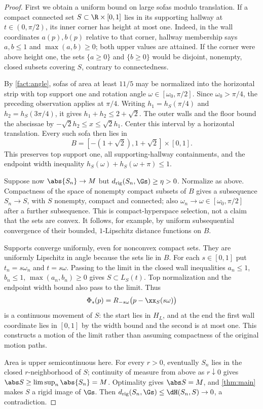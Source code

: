 \begin{proof}
First we obtain a uniform bound on large sofas modulo translation. If a
compact connected set $S\subset\R\times[0,1]$ lies in its supporting hallway
at $t\in(0,\pi/2)$, its inner corner has height at most one. Indeed, in the
wall coordinates $a(p),b(p)$ relative to that corner, hallway membership says
$a,b\le1$ and $\max(a,b)\ge0$; both upper values are attained. If the corner
were above height one, the sets $\{a\ge0\}$ and $\{b\ge0\}$ would be disjoint,
nonempty, closed subsets covering $S$, contrary to connectedness.

By \cref{fact:angle}, sofas of area at least $11/5$ may be normalized into
the horizontal strip with top support one and rotation angle
$\omega\in[\omega_0,\pi/2]$. Since $\omega_0>\pi/4$, the preceding observation
applies at $\pi/4$. Writing $h_1=h_S(\pi/4)$ and $h_2=h_S(3\pi/4)$, it gives
$h_1+h_2\le2+\sqrt2$. The outer walls and the floor bound the abscissae by
$-\sqrt2h_2\le x\le\sqrt2h_1$. Center this interval by a horizontal translation.
Every such sofa then lies in
\[
 B=[-(1+\sqrt2),1+\sqrt2]\times[0,1].
\]
This preserves top support one, all supporting-hallway containments, and the
endpoint width inequality $h_S(\omega)+h_S(\omega+\pi)\le1$.

Suppose now $\abs{S_n}\to M$ but $d_{\rm rig}(S_n,\Gs)\ge\eta>0$. Normalize
as above. Compactness of the space of nonempty compact subsets of $B$ gives
a subsequence $S_n\to S$, with $S$ nonempty, compact and connected; also
$\omega_n\to\omega\in[\omega_0,\pi/2]$ after a further subsequence.
This is compact-hyperspace selection, not a claim that the sets are convex.
It follows, for example, by uniform subsequential convergence of their
bounded, $1$-Lipschitz distance functions on $B$.

Supports converge uniformly, even for nonconvex compact sets. They are
uniformly Lipschitz in angle because the sets lie in $B$. For each
$s\in[0,1]$ put $t_n=s\omega_n$ and $t=s\omega$. Passing to the limit in the
closed wall inequalities $a_n\le1$, $b_n\le1$, $\max(a_n,b_n)\ge0$ gives
$S\subset L_S(t)$. Top normalization and the endpoint width bound also pass
to the limit. Thus
\[
 \Phi_s(p)=R_{-s\omega}\bigl(p-\xx_S(s\omega)\bigr)
\]
is a continuous movement of $S$: the start lies in $H_L$, and at the end the
first wall coordinate lies in $[0,1]$ by the width bound and the second is at
most one. This constructs a motion of the limit rather than assuming
compactness of the original motion paths.

Area is upper semicontinuous here. For every $r>0$, eventually $S_n$ lies in
the closed $r$-neighborhood of $S$; continuity of measure from above as
$r\downarrow0$ gives $\abs S\ge\limsup_n\abs{S_n}=M$. Optimality gives
$\abs S=M$, and \cref{thm:main} makes $S$ a rigid image of $\Gs$.
Then $d_{\rm rig}(S_n,\Gs)\le\dH(S_n,S)\to0$, a contradiction.


\end{proof}
